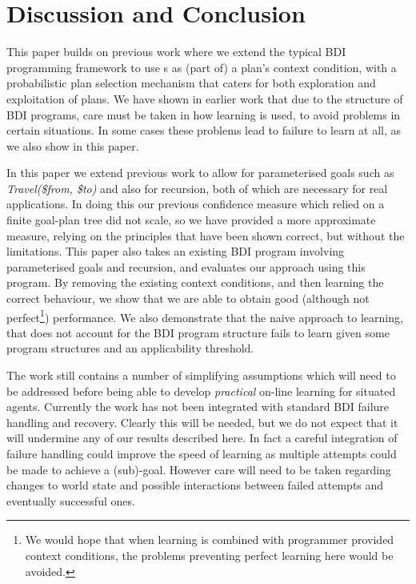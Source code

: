 \section{Discussion and Conclusion}\label{sec:discussion}

This paper builds on previous work where we extend
the typical BDI programming framework to use \dt{}s as (part of) a
plan's context condition, with a probabilistic plan selection
mechanism that caters for both exploration and exploitation of plans.
We have shown in earlier work that due to the structure of BDI
programs, care must be taken in how learning is used, to avoid
problems in certain situations. In some cases these problems lead to
failure to learn at all, as we also show in this paper.

In this paper we extend previous work to allow for parameterised
goals such as {\it Travel(\$from, \$to)} and also for recursion, both
of which are necessary for real applications. In doing this our
previous confidence measure which relied on a finite goal-plan tree
did not scale, so we have provided a more approximate measure, relying
on the principles that have been shown correct, but without the
limitations. This paper also takes an existing BDI program involving
parameterised goals and recursion, and evaluates our approach using
this program. By removing the existing context conditions, and then
learning the correct behaviour, we show that we are able to obtain
good (although not perfect\footnote{We would hope that when learning
is combined with programmer provided context conditions, the problems
preventing perfect learning here would be avoided.}) performance. We
also demonstrate that the naive approach to learning, that does not
account for the BDI program structure fails to learn given
some program structures and an applicability threshold.

The work still contains a number of simplifying assumptions which will
need to be addressed before being able to develop {\it practical} on-line
learning for situated agents. Currently the work has not been
integrated with standard BDI failure handling and recovery. Clearly
this will be needed, but we do not expect that it will undermine any
of our results described here. In fact a careful integration of
failure handling could improve the speed of learning as multiple
attempts could be made to achieve a (sub)-goal. However care will need
to be taken regarding changes to world state and possible interactions
between failed attempts and eventually successful ones.

